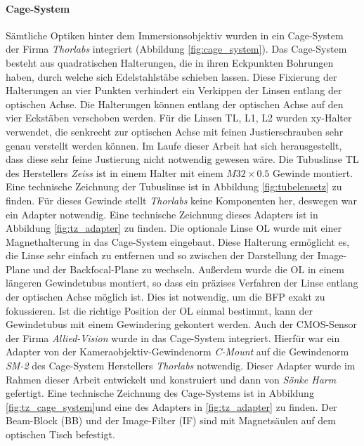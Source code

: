 \documentclass[titlepage,  ngerman]{article}
\begin{document}
	\paragraph{Cage-System}
	Sämtliche Optiken hinter dem Immersionsobjektiv wurden in ein Cage-System der Firma \textit{Thorlabs} integriert (Abbildung \ref{fig:cage_system}). Das Cage-System besteht aus quadratischen Halterungen, die in ihren Eckpunkten Bohrungen haben, durch welche sich Edelstahlstäbe schieben lassen. Diese Fixierung der Halterungen an vier Punkten verhindert ein Verkippen der Linsen entlang der optischen Achse. Die Halterungen können entlang der optischen Achse auf den vier Eckstäben verschoben werden. Für die  Linsen TL, L1, L2 wurden xy-Halter verwendet, die senkrecht zur optischen Achse mit feinen Justierschrauben sehr genau verstellt werden können. Im Laufe dieser Arbeit hat sich herausgestellt, dass diese sehr feine Justierung nicht notwendig gewesen wäre. Die Tubuslinse TL des Herstellers \textit{Zeiss} ist in einem Halter mit einem $M32\times0.5$ Gewinde montiert. Eine technische Zeichnung der Tubuslinse ist in Abbildung \ref{fig:tubelensetz} zu finden. Für dieses Gewinde stellt \textit{Thorlabs} keine Komponenten her, deswegen war ein Adapter notwendig. Eine technische Zeichnung dieses Adapters ist in Abbildung \ref{fig:tz_adapter} zu finden. Die optionale Linse OL wurde mit einer Magnethalterung in das Cage-System eingebaut. Diese Halterung ermöglicht es, die Linse sehr einfach zu entfernen und so zwischen der Darstellung der Image-Plane und der Backfocal-Plane zu wechseln. Außerdem wurde die OL in einem längeren Gewindetubus montiert, so dass ein präzises Verfahren der Linse entlang der optischen Achse möglich ist. Dies ist notwendig, um die BFP exakt zu fokussieren. Ist die richtige Position der OL einmal bestimmt, kann der Gewindetubus mit einem Gewindering gekontert werden. Auch der CMOS-Sensor der Firma \textit{Allied-Vision} wurde in das Cage-System integriert. Hierfür war ein Adapter von der Kameraobjektiv-Gewindenorm \textit{C-Mount} auf die Gewindenorm \textit{SM-2} des Cage-System Herstellers \textit{Thorlabs} notwendig. Dieser Adapter wurde im Rahmen dieser Arbeit entwickelt und konstruiert und dann von \textit{Sönke Harm} gefertigt. Eine technische Zeichnung des Cage-Systems ist in Abbildung \ref{fig:tz_cage_system}und eine des Adapters in \ref{fig:tz_adapter} zu finden. Der Beam-Block (BB) und der Image-Filter (IF) sind mit Magnetsäulen auf dem optischen Tisch befestigt.
\end{document}
